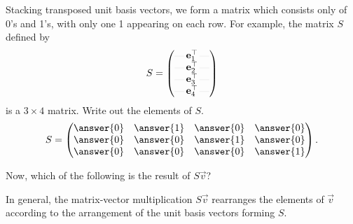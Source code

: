 \documentclass{ximera}
\newcommand{\rvx}[1]{\rule[0.5ex]{1em}{.05pt}\,#1\,\rule[0.5ex]{1em}{.05pt}}
\begin{document}
\begin{exercise}
  Stacking transposed unit basis vectors, we form a matrix which
  consists only of 0's and 1's, with only one 1 appearing on each row. For
  example, the matrix $S$ defined by
  \[
    S =
    \begin{pmatrix}
    \rvx{\vec{e}_1^\transpose}\\
      \rvx{\vec{e}_2^\transpose}\\
      \rvx{\vec{e}_3^\transpose}\\
      \rvx{\vec{e}_4^\transpose}
    \end{pmatrix}
  \]
  is a $3 \times 4$ matrix. Write out the elements of $S$.
  \[
    S =
    \begin{pmatrix}
      \answer{0} & \answer{1} & \answer{0} & \answer{0} \\
      \answer{0} & \answer{0} & \answer{1} & \answer{0} \\
      \answer{0} & \answer{0} & \answer{0} & \answer{1}
    \end{pmatrix}.
  \]

  Now, which of the following is the result of $S \vec{v}$?
  \begin{multipleChoice}
  \end{multipleChoice}

  \begin{feedback}[correct]
    In general, the matrix-vector multiplication $S \vec{v}$
    rearranges the elements of $\vec{v}$ according to the arrangement
    of the unit basis vectors forming $S$.
  \end{feedback}
\end{exercise}
\end{document}

